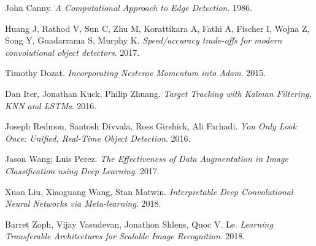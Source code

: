 \documentclass[12pt]{article}%
\begin{document}
\begin{thebibliography}{9}
John Canny. 
\textit{A Computational Approach to Edge Detection}. 
1986.

Huang J, Rathod V, Sun C, Zhu M, Korattikara A, Fathi A, Fischer I, Wojna Z,
Song Y, Guadarrama S, Murphy K.
\textit{Speed/accuracy trade-offs for modern convolutional object detectors}.
2017.

Timothy Dozat.
\textit{Incorporating Nesterov Momentum into Adam}.
2015.
 
Dan Iter, Jonathan Kuck, Philip Zhuang.
\textit{Target Tracking with Kalman Filtering, KNN and LSTMs}.
2016.

Joseph Redmon, Santosh Divvala, Ross Girshick, Ali Farhadi.
\textit{You Only Look Once: Unified, Real-Time Object Detection}.
2016.
 
Jason Wang; Luis Perez.
\textit{The Effectiveness of Data Augmentation in Image Classification using Deep Learning}.
2017.
 
Xuan Liu, Xiaoguang Wang, Stan Matwin.
\textit{Interpretable Deep Convolutional Neural Networks via Meta-learning}.
2018.

Barret Zoph, Vijay Vasudevan, Jonathon Shlens, Quoc V. Le.
\textit{Learning Transferable Architectures for Scalable Image Recognition}.
2018.
\end{thebibliography}
\end{document}
